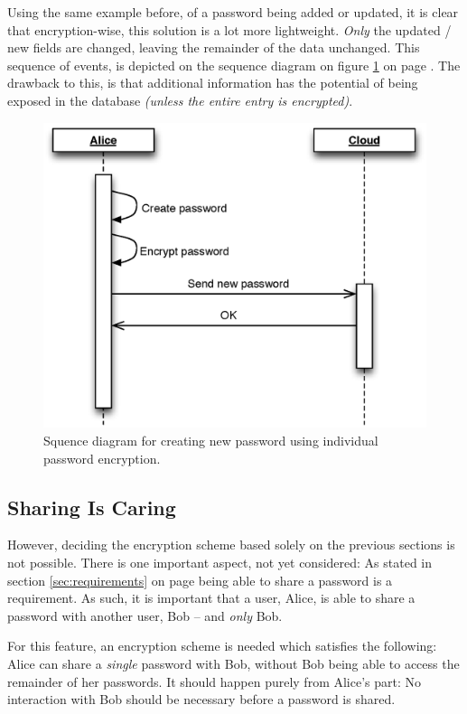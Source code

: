 			Using the same example before, of a password being added or updated, it is clear that encryption-wise, this solution is a lot more lightweight. \emph{Only} the updated / new fields are changed, leaving the remainder of the data unchanged. This sequence of events, is depicted on the sequence diagram on figure \ref{fig:seq_perentry} on page \pageref{fig:seq_perentry}. The drawback to this, is that additional information has the potential of being exposed in the database \emph{(unless the entire entry is encrypted)}.


			\begin{figure}[h!]
				\centering
				\includegraphics[width=\textwidth]{figures/design/uml/sequence/individual.eps}
				\caption{Squence diagram for creating new password using individual password encryption.}
				\label{fig:seq_perentry}
			\end{figure}

		\subsection{Sharing Is Caring}
			\label{sec:share}
			However, deciding the encryption scheme based solely on the previous sections is not possible. There is one important aspect, not yet considered: As stated in section \ref{sec:requirements} on page \pageref{sec:requirements} being able to share a password is a requirement. As such, it is important that a user, Alice, is able to share a password with another user, Bob -- and \emph{only} Bob.

			For this feature, an encryption scheme is needed which satisfies the following: Alice can share a \emph{single} password with Bob, without Bob being able to access the remainder of her passwords. It should happen purely from Alice's part: No interaction with Bob should be necessary before a password is shared.


